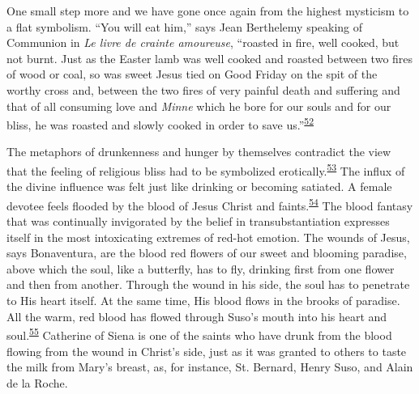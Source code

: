 One small step more and we have gone once again from the highest
mysticism to a flat symbolism. ``You will eat him,'' says Jean
Berthelemy speaking of Communion in \emph{Le livre de crainte
amoureuse}, ``roasted in fire, well cooked, but not burnt. Just as the
Easter lamb was well cooked and roasted between two fires of wood or
coal, so was sweet Jesus tied on Good Friday on the spit of the worthy
cross and, between the two fires of very painful death and suffering and
that of all consuming love and \emph{Minne} which he bore for our souls
and for our bliss, he was roasted and slowly cooked in order to save
us.''\textsuperscript{\protect\hypertarget{15_Chapter_Eight__RELIGIOUS_EXCITAT.xhtmlux5cux23id_804}{\protect\hyperlink{23_NOTES.xhtmlux5cux23id_805}{52}}}

The metaphors of drunkenness and hunger by themselves contradict the
view that the feeling of religious bliss had to be symbolized
erotically.\textsuperscript{\protect\hypertarget{15_Chapter_Eight__RELIGIOUS_EXCITAT.xhtmlux5cux23id_802}{\protect\hyperlink{23_NOTES.xhtmlux5cux23id_803}{53}}}
The influx of the divine influence was felt just like drinking or
becoming satiated. A female devotee feels flooded by the blood of Jesus
Christ and
faints.\textsuperscript{\protect\hypertarget{15_Chapter_Eight__RELIGIOUS_EXCITAT.xhtmlux5cux23id_800}{\protect\hyperlink{23_NOTES.xhtmlux5cux23id_801}{54}}}
The blood fantasy that was continually invigorated by the belief in
transubstantiation expresses itself in the most intoxicating extremes of
red-hot emotion. The wounds of Jesus, says Bonaventura, are the blood
red flowers of our sweet and blooming paradise, above which the soul,
like a butterfly, has to fly, drinking first from one flower and then
from another. Through the wound in his side, the soul has to penetrate
\protect\hypertarget{15_Chapter_Eight__RELIGIOUS_EXCITAT.xhtmlux5cux23page_232}{}{}to
His heart itself. At the same time, His blood flows in the brooks of
paradise. All the warm, red blood has flowed through Suso's mouth into
his heart and
soul.\textsuperscript{\protect\hypertarget{15_Chapter_Eight__RELIGIOUS_EXCITAT.xhtmlux5cux23id_798}{\protect\hyperlink{23_NOTES.xhtmlux5cux23id_799}{55}}}
Catherine of Siena is one of the saints who have drunk from the blood
flowing from the wound in Christ's side, just as it was granted to
others to taste the milk from Mary's breast, as, for instance, St.
Bernard, Henry Suso, and Alain de la Roche.

